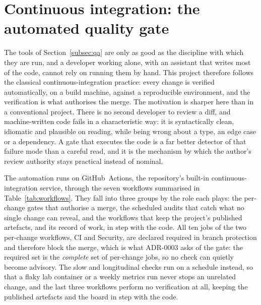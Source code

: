 \section{Continuous integration: the automated quality gate}
\label{sec:ci}

The tools of Section~\ref{subsec:qa} are only as good as the discipline with which
they are run, and a developer working alone, with an assistant that writes most of
the code, cannot rely on running them by hand. This project therefore follows the
classical continuous-integration practice: every
change is verified automatically, on a build machine, against a reproducible
environment, and the verification is what authorises the merge. The motivation is
sharper here than in a conventional project. There is no second developer to review a
diff, and machine-written code fails in a characteristic way: it is syntactically
clean, idiomatic and plausible on reading, while being wrong about a type, an edge
case or a dependency. A gate that executes the code is a far better detector of that
failure mode than a careful read, and it is the mechanism by which the author's
review authority stays practical instead of nominal.

The automation runs on GitHub~Actions, the repository's built-in continuous-integration
service, through the seven workflows summarised in Table~\ref{tab:workflows}. They fall
into three groups by the role each plays: the per-change gates that authorise a merge,
the scheduled audits that catch what no single change can reveal, and the workflows
that keep the project's published artefacts, and its record of work, in step with the
code. All ten jobs of the two per-change workflows, CI and Security, are declared
required in branch protection and therefore block the merge, which is what ADR-0003 asks
of the gate: the required set is the \emph{complete} set of per-change jobs, so no check
can quietly become advisory. The slow and longitudinal checks run on a schedule instead,
so that a flaky lab container or a weekly metrics run never stops an unrelated change,
and the last three workflows perform no verification at all, keeping the published
artefacts and the board in step with the code.

